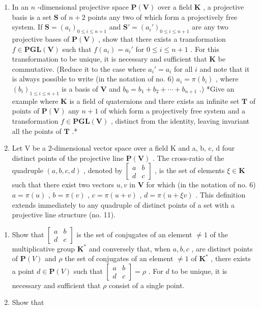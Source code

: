 \begin{enumerate}
\def\labelenumi{\arabic{enumi}.}
\setcounter{enumi}{9}
\item
  In an \(n\) -dimensional projective space \(\mathbf{P}(\mathbf{V})\) over a field \(\mathbf{K}\) , a projective basis is a set \(\mathbf{S}\) of \(n + 2\) points any two of which form a projectively free system. If \(\mathbf{S} = (a_i)_{0 \leqslant i \leqslant n + 1}\) and \(\mathbf{S}' = (a_i')_{0 \leqslant i \leqslant n + 1}\) are any two projective bases of \(\mathbf{P}(\mathbf{V})\) , show that there exists a transformation \(f \in \mathbf{PGL}(\mathbf{V})\) such that \(f(a_i) = a_i'\) for \(0 \leqslant i \leqslant n + 1\) . For this transformation to be unique, it is necessary and sufficient that \(\mathbf{K}\) be commutative. (Reduce it to the case where \(a_i' = a_i\) for all \(i\) and note that it is always possible to write (in the notation of no. 6) \(a_i = \pi(b_i)\) , where \((b_i)_{1 \leqslant i \leqslant n + 1}\) is a basis of \(\mathbf{V}\) and \(b_0 = b_1 + b_2 + \cdots + b_{n+1}\) .) *Give an example where \(\mathbf{K}\) is a field of quaternions and there exists an infinite set \(\mathbf{T}\) of points of \(\mathbf{P}(\mathbf{V})\) any \(n + 1\) of which form a projectively free system and a transformation \(f \in \mathbf{PGL}(\mathbf{V})\) , distinct from the identity, leaving invariant all the points of \(\mathbf{T}\) .*
\item
  Let V be a 2-dimensional vector space over a field K and a, b, c, d four distinct points of the projective line \(\mathbf{P}(\mathbf{V})\) . The cross-ratio of the quadruple \((a, b, c, d)\) , denoted by \(\begin{bmatrix} a & b \\ d & c \end{bmatrix}\) , is the set of elements \(\xi \in \mathbf{K}\) such that there exist two vectors \(u, v\) in \(\mathbf{V}\) for which (in the notation of no. 6) \(a = \pi(u)\) , \(b = \pi(v)\) , \(c = \pi(u + v)\) , \(d = \pi(u + \xi v)\) . This definition extends immediately to any quadruple of distinct points of a set with a projective line structure (no. 11).
\end{enumerate}

\begin{enumerate}
\def\labelenumi{(\alph{enumi})}
\item
  Show that \(\begin{bmatrix} a & b \\ d & c \end{bmatrix}\) is the set of conjugates of an element \(\neq 1\) of the multiplicative group \(\mathbf{K}^*\) and conversely that, when \(a, b, c\) , are distinct points of \(\mathbf{P}(V)\) and \(\rho\) the set of conjugates of an element \(\neq 1\) of \(\mathbf{K}^*\) , there exists a point \(d \in \mathbf{P}(V)\) such that \(\begin{bmatrix} a & b \\ d & c \end{bmatrix} = \rho\) . For \(d\) to be unique, it is necessary and sufficient that \(\rho\) consist of a single point.
\item
  Show that
\end{enumerate}


